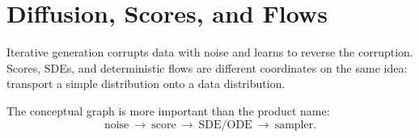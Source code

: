 \chapter{Diffusion, Scores, and Flows}
\label{ch:diffusion}

Iterative generation corrupts data with noise and learns to reverse the corruption. Scores, SDEs, and deterministic flows are different coordinates on the same idea: transport a simple distribution onto a data distribution.

The conceptual graph is more important than the product name:
\[
\text{noise}\ \rightarrow\ \text{score}\ \rightarrow\ \text{SDE/ODE}\ \rightarrow\ \text{sampler}.
\]

